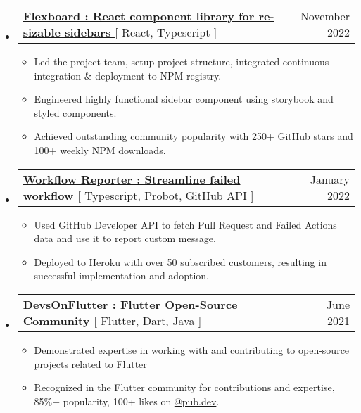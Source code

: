\documentclass[letterpaper,11pt]{article}
\makeatletter
\newcommand{\resumeItem}[1]{
  \item\small{
    {#1 \vspace{-2pt}}
  }
}
\newcommand{\resumeProjectHeading}[2]{
    \item
    \begin{tabular*}{0.97\textwidth}{l@{\extracolsep{\fill}}r}
      \small#1 & #2 \\
    \end{tabular*}\vspace{-7pt}
}
\newcommand{\resumeSubHeadingListStart}{\begin{itemize}[leftmargin=0.15in, label={}]}
\newcommand{\resumeSubHeadingListEnd}{\end{itemize}}
\newcommand{\resumeItemListStart}{\begin{itemize}}
\newcommand{\resumeItemListEnd}{\end{itemize}\vspace{-5pt}}
\makeatother
\begin{document}
    \resumeSubHeadingListStart
      \resumeProjectHeading
          {\textbf{\href{https://github.com/dorbus/flexboard}{Flexboard : React component library for re-sizable sidebars }}{[ React, Typescript ]}}{November 2022}
          \resumeItemListStart
            \resumeItem{Led the project team, setup project structure, integrated continuous integration \& deployment to NPM registry.}
            \resumeItem{Engineered highly functional sidebar component using storybook and styled components.}
            \resumeItem{Achieved outstanding community popularity with 250+ GitHub stars and 100+ weekly \href{https://www.npmjs.com/package/@dorbus/flexboard}{NPM} downloads.}
          \resumeItemListEnd
    \resumeSubHeadingListEnd

    \resumeSubHeadingListStart
      \resumeProjectHeading
          {\textbf{\href{https://github.com/marketplace/workflow-reporter} {Workflow Reporter : Streamline failed workflow }}{[ Typescript, Probot, GitHub API ]}}{January 2022}
          \resumeItemListStart
           \resumeItem{Used GitHub Developer API to fetch Pull Request and Failed Actions data and use it to report custom message.}
           \resumeItem{Deployed to Heroku with over 50 subscribed customers, resulting in successful implementation and adoption.}
          \resumeItemListEnd
    \resumeSubHeadingListEnd

    \resumeSubHeadingListStart
      \resumeProjectHeading
          {\textbf{\href{https://github.com/DevsOnFlutter}{DevsOnFlutter : Flutter Open-Source Community }}{[ Flutter, Dart, Java ]}}{June 2021}
          \resumeItemListStart
          \resumeItem{Demonstrated expertise in working with and contributing to open-source projects related to Flutter}
           \resumeItem{Recognized in the Flutter community for contributions and expertise, 85\%+ popularity, 100+ likes on \href{https://pub.dev/publishers/hackthedeveloper.com/packages}{@pub.dev}.}
          \resumeItemListEnd
    \resumeSubHeadingListEnd
    
\end{document}
